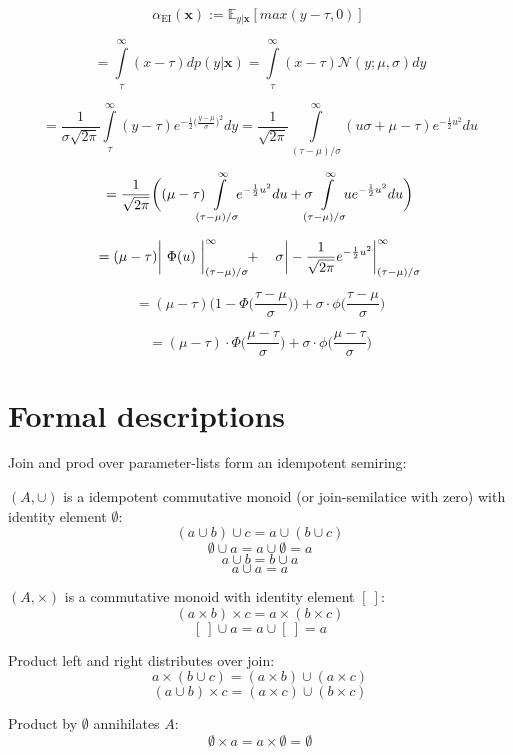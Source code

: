 \documentclass[english]{article}
\newcommand{\EI}{\operatorname{EI}}
\newcommand{\x}{\mathbf{x}}
\begin{document}
$$\alpha_{\EI}(\x) := \mathbb{E}_{y|\x}[max(y-\tau, 0)]\ $$

$$= \int\limits_{\tau}^{\infty}(x-\tau)dp(y|\x) = \int\limits_{\tau}^{\infty}(x-\tau)\mathcal{N}(y;\mu,\sigma)dy$$

$$ = \frac{1}{\sigma\sqrt{2\pi}} \int\limits_{\tau}^{\infty}(y-\tau)e^{-\frac{1}{2}\big(\frac{y-\mu}{\sigma}\big)^2}dy =
\frac{1}{\sqrt{2\pi}} \int\limits_{(\tau-\mu)/\sigma}^{\infty}(u\sigma+\mu-\tau)e^{-\frac{1}{2}u^2}du$$

$$=\frac{1}{\sqrt{2\pi}}\bigg((\mu-\tau) \mkern-12mu \int\limits_{(\tau-\mu)/\sigma}^{\infty} \mkern-10mu e^{-\frac{1}{2}u^2}du + \sigma \mkern-12mu \int\limits_{(\tau-\mu)/\sigma}^{\infty} \mkern-10mu u e^{-\frac{1}{2}u^2}du \bigg)$$

$$=(\mu-\tau)\bigg|\ \Phi(u)\ \bigg|_{(\tau-\mu)/\sigma}^{\infty} \mkern-6mu + \ \ \ \sigma\bigg|-\frac{1}{\sqrt{2\pi}}e^{-\frac{1}{2}u^2}\bigg|_{(\tau-\mu)/\sigma}^{\infty}$$

$$=(\mu-\tau)\bigg(1-\Phi\bigg(\frac{\tau-\mu}{\sigma}\bigg)\bigg) + \sigma \cdot \phi \bigg(\frac{\tau-\mu}{\sigma}\bigg)$$

$$ = (\mu - \tau) \cdot \Phi \bigg(\frac{\mu-\tau}{\sigma}\bigg) + \sigma \cdot \phi \bigg(\frac{\mu-\tau}{\sigma}\bigg)$$


\section{Formal descriptions}
Join and prod over parameter-lists form an idempotent semiring:

$(A, \cup)$ is a idempotent commutative monoid (or join-semilatice with zero) with identity element $\emptyset$:
$$(a \cup b) \cup c = a \cup (b \cup c)$$
$$\emptyset \cup a = a \cup \emptyset = a$$
$$a \cup b = b \cup a$$
$$a \cup a = a$$

$(A, \times)$ is a commutative monoid with identity element $[\ ]$:
$$(a \times b) \times c = a \times (b \times c)$$
$$[\ ] \cup a = a \cup [\ ] = a$$

Product left and right distributes over join:
$$a\times(b \cup c) = (a\times b) \cup (a\times c)$$
$$(a \cup b)\times c = (a\times c) \cup (b\times c)$$

Product by $\emptyset$ annihilates $A$:
$$\emptyset \times a = a \times \emptyset = \emptyset$$


\printbibliography


 
\end{document}
